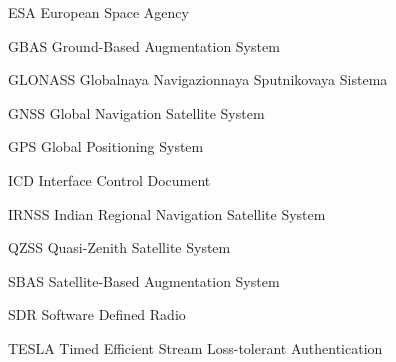 \begin{abbreviations}

\item[ESA] European Space Agency
\item[GBAS] Ground-Based Augmentation System
\item[GLONASS] Globalnaya Navigazionnaya Sputnikovaya Sistema
\item[GNSS] Global Navigation Satellite System
\item[GPS] Global Positioning System
\item[ICD] Interface Control Document
\item[IRNSS] Indian Regional Navigation Satellite System
\item[QZSS] Quasi-Zenith Satellite System
\item[SBAS] Satellite-Based Augmentation System
\item[SDR] Software Defined Radio
\item[TESLA] Timed Efficient Stream Loss-tolerant Authentication

\end{abbreviations}
